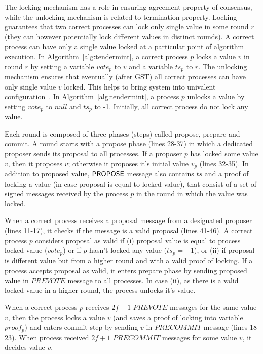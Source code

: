 The locking mechanism has a role in ensuring agreement property of consensus, while the unlocking mechanism is related to termination property. Locking guarantees that two correct processes can lock only single value in some round $r$ (they can however potentially lock different values in distinct rounds). A correct process can have only a single value locked at a particular point of algorithm execution. In Algorithm~\ref{alg:tendermint}, a correct process $p$ locks a value $v$ in round $r$ by setting a variable $vote_p$ to $v$ and a variable $ts_p$ to $r$. The unlocking mechanism ensures that eventually (after GST) all correct processes can have only single value $v$ locked. This helps to bring system into univalent configuration~\cite{FLP85:jacm}. In Algorithm~\ref{alg:tendermint}, a process $p$ unlocks a value by setting $vote_p$ to $null$ and $ts_p$ to -1. Initially, all correct process do not lock any value.

Each round is composed of three phases (steps) called propose, prepare and commit. A round starts with a propose phase (lines 28-37) in which a dedicated proposer sends its proposal to all processes. If a proposer $p$ has locked some value $v$, then it proposes $v$; otherwise it proposes it's initial value $v_p$ (lines 32-35). In addition to proposed value, $\mathsf{PROPOSE}$ message also contains $ts$ and a proof of locking a value (in case proposal is equal to locked value), that consist of a set of signed messages received by the process $p$ in the round in which the value was locked. 

When a correct process receives a proposal message from a designated proposer (lines 11-17), it checks if the message is a valid proposal (lines 41-46). A correct process $p$ considers proposal as valid if (i) proposal value is equal to process locked value ($vote_p$) or if $p$ hasn't locked any value ($ts_p = -1$), or (ii) if proposal is different value but from a higher round and with a valid proof of locking. If a process accepts proposal as valid, it enters prepare phase by sending proposed value in $PREVOTE$ message to all processes. In case (ii), as there is a valid locked value in a higher round, the process unlocks it's value.  

When a correct process $p$ receives $2f+1$ $PREVOTE$ messages for the same value $v$, then the process locks a value $v$ (and saves a proof of locking into variable $proof_p$) and enters commit step by sending $v$ in $PRECOMMIT$ message (lines 18-23). When process received $2f+1$ $PRECOMMIT$ messages for some value $v$, it decides value $v$. 


